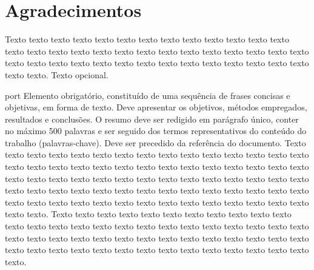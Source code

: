 \chapter*{Agradecimentos}

Texto texto texto texto texto texto texto texto texto texto texto texto texto
texto texto texto texto texto texto texto texto texto texto texto texto texto
texto texto texto texto texto texto texto texto texto texto texto texto texto
texto texto texto texto. Texto opcional.

\begin{resumo}{port}
Elemento obrigatório, constituído de uma sequência de frases concisas e
objetivas, em forma de texto.  Deve apresentar os objetivos, métodos empregados,
resultados e conclusões.  O resumo deve ser redigido em parágrafo único, conter
no máximo 500 palavras e ser seguido dos termos representativos do conteúdo do
trabalho (palavras-chave). Deve ser precedido da referência do documento.
Texto texto texto texto texto texto texto texto texto texto texto texto texto
texto texto texto texto texto texto texto texto texto texto texto texto texto
texto texto texto texto texto texto texto texto texto texto texto texto texto
texto texto texto texto texto texto texto texto texto texto texto texto texto
texto texto texto texto texto texto texto texto texto texto texto texto texto
texto texto texto texto texto texto texto texto.
Texto texto texto texto texto texto texto texto texto texto texto texto texto
texto texto texto texto texto texto texto texto texto texto texto texto texto
texto texto texto texto texto texto texto texto texto texto texto texto texto
texto texto texto texto texto texto texto texto texto texto texto texto texto
texto texto.
\end{resumo}

